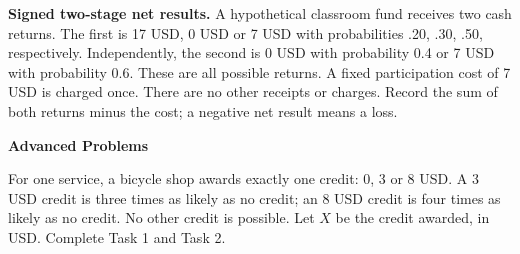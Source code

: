 \textbf{Signed two-stage net results.} A hypothetical classroom fund receives two cash returns. The first is
17 USD, 0 USD or 7 USD with probabilities .20, .30, .50, respectively. Independently, the second is 0 USD with
probability 0.4 or 7 USD with probability 0.6. These are all possible returns. A fixed participation cost of 7
USD is charged once. There are no other receipts or charges. Record the sum of both returns minus the cost; a
negative net result means a loss.

\clearpage
\begingroup
\small
\setlength{\parskip}{3pt}
\setlength{\tabcolsep}{3pt}
\setlength{\extrarowheight}{0pt}
\renewcommand{\arraystretch}{1}
{\centering\large\bfseries Advanced Problems\par}

For one service, a bicycle shop awards exactly one credit: 0, 3 or 8 USD.
A 3 USD credit is three times as likely as no credit; an 8 USD credit is
four times as likely as no credit. No other credit is possible.
Let $X$ be the credit awarded, in USD. Complete Task 1 and Task 2.

